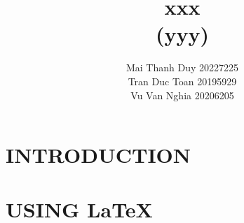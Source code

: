 \documentclass[twocolumn]{article}
\begin{document}
\title{xxx\\(yyy)}
\author{
Mai Thanh Duy 20227225 \\
Tran Duc Toan 20195929 \\
Vu Van Nghia 20206205
}
\maketitle


\section{INTRODUCTION}


% 

% 

% 

% 


\renewcommand{\refname}{REFERENCES}


\section{USING \LaTeX}

\end{document}
